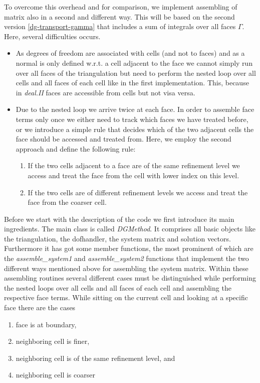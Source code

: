 \documentclass[11pt]{article}
\begin{document}
To overcome this overhead and for comparison, we implement
assembling of matrix also in a second and different way. This will
be based on the second version \eqref{dg-transport-gamma} that
includes a sum of integrals over all faces $\Gamma$. Here, several
difficulties occurs.
\begin{itemize}
\item As degrees of freedom are associated with cells (and not to faces)
  and as a normal is only defined w.r.t. a cell adjacent to the face we
  cannot simply run over all faces of the triangulation but need to
  perform the nested loop over all cells and all faces of each cell
  like in the first implementation.  This, because in \emph{deal.II}
  faces are accessible from cells but not visa versa.
\item Due to the nested loop we arrive twice at each face. In order to
  assemble face terms only once we either need to track which
  faces we have treated before, or we introduce a simple rule that decides
  which of the two adjacent cells the face should be accessed and
  treated from.  Here, we employ the second approach and define the
  following rule:
  \begin{enumerate}
  \renewcommand{\labelenumi}{\alph{enumi})}
  \item If the two cells adjacent to a face are of the same refinement level we access and treat the face from the cell with lower index on this level.
  \item If the two cells are of different refinement levels we access
    and treat the face from the coarser cell.
  \end{enumerate}
\end{itemize}
Before we start with the description of the code we first introduce
its main ingredients. The main class is called
\emph{DGMethod}. It comprises all basic objects like the
triangulation, the dofhandler, the system matrix and solution vectors.
Furthermore it has got some member functions, the most prominent of
which are the \emph{assemble\_system1} and \emph{assemble\_system2}
functions that implement the two different ways mentioned above for
assembling the system matrix. Within these assembling routines several
different cases must be distinguished while performing the nested
loops over all cells and all faces of each cell and assembling the
respective face terms. While sitting on the current cell and looking
at a specific face there are the cases
\begin{enumerate}
\item face is at boundary,
\item neighboring cell is finer,
\item neighboring cell is of the same refinement level, and
\item neighboring cell is coarser
\end{enumerate}
\end{document}
